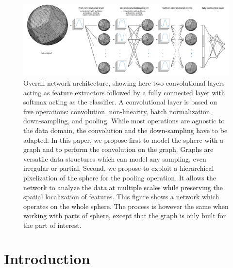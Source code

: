 \documentclass[final,twocolumn,3p,times,authoryear]{elsarticle}
\newcommand{\nati}[1]{{\color[rgb]{.1,.6,.1}{#1}}}
\newcommand{\TK}[1]{{\color{red}{TK:#1}}}
\newcommand{\1}{\b{1}}              %
\newcommand{\0}{\b{0}}              %
\begin{document}
\begin{figure}
	\centering
	\includegraphics[width=\linewidth]{figure_architecture_v3.pdf}
	\caption{Overall network architecture, showing here two convolutional layers acting as feature extractors followed by a fully connected layer with softmax acting as the classifier.
    A convolutional layer is based on five operations: convolution, non-linearity, batch normalization, down-sampling, and pooling. While most operations are agnostic to the data domain, the convolution and the down-sampling have to be adapted. In this paper, we propose first to model the sphere with a graph and to perform the convolution on the graph. Graphs are versatile data structures which can model any sampling, even irregular or partial. Second, we propose to exploit a hierarchical pixelization of the sphere for the pooling operation. It allows the network to analyze the data at multiple scales while preserving the spatial localization of features. This figure shows a network which operates on the whole sphere. The process is however the same when working with parts of sphere, except that the graph is only built for the part of interest.}
	\label{fig:architecture}
\end{figure}

\section{Introduction}
\label{sec:intro}

\end{document}
